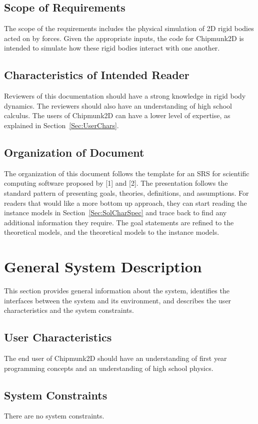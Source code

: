 \documentclass[12pt]{article}
\begin{document}
\subsection{Scope of Requirements}
\label{Sec:ReqsScope}
The scope of the requirements includes the physical simulation of 2D rigid bodies acted on by forces. Given the appropriate inputs, the code for Chipmunk2D is intended to simulate how these rigid bodies interact with one another.
\subsection{Characteristics of Intended Reader}
\label{Sec:ReaderChars}
Reviewers of this documentation should have a strong knowledge in rigid body dynamics. The reviewers should also have an understanding of high school calculus. The users of Chipmunk2D can have a lower level of expertise, as explained in Section~\ref{Sec:UserChars}.
\subsection{Organization of Document}
\label{Sec:DocOrg}
The organization of this document follows the template for an SRS for scientific computing software proposed by {[}1{]} and {[}2{]}. The presentation follows the standard pattern of presenting goals, theories, definitions, and assumptions. For readers that would like a more bottom up approach, they can start reading the instance models in Section~\ref{Sec:SolCharSpec} and trace back to find any additional information they require.
The goal statements are refined to the theoretical models, and the theoretical models to the instance models.
\section{General System Description}
\label{Sec:GenSysDesc}
This section provides general information about the system, identifies the interfaces between the system and its environment, and describes the user characteristics and the system constraints.
\subsection{User Characteristics}
\label{Sec:usercharacteristic}
The end user of Chipmunk2D should have an understanding of first year programming concepts and an understanding of high school physics.
\subsection{System Constraints}
\label{Sec:SysConstraints}
There are no system constraints.
\end{document}
